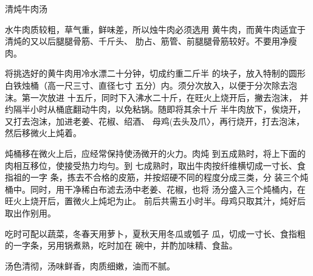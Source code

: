 \begin{recipe}{清炖牛肉汤}

\ingredients



\cooking

水牛肉质较粗，草气重，鲜味差，所以烛牛肉必须选用 黄牛肉，而黄牛肉适宜于清炖的又以后腿腿骨筋、千斤头、 肋占、筋管、前腿腿骨筋较好。不要用净瘦肉。

将挑选好的黄牛肉用冷水漂二十分钟，切成约重二斤半 的块子，放入特制的圆形白铁烛桶（高一尺三寸、直径七寸 五分）内。须分次放入，以便于分次除去泡沫。第一次放进 十五斤，同时下入沸水二十斤，在旺火上烧开后，撇去泡沫， 并约隔半小时从桶底翻动牛肉，以免粘锅。随即将其余十斤 半牛肉放下，俟烧开，又打去泡沫，加进老姜、花椒、绍酒、 母鸡(去头及爪〉，再行烧开，打去泡沫，然后移微火上炖着。

炖桶移在微火上后，应经常保持使汤微开的火力。肉炖 到五成熟时，将上下面的肉相互移位，使接受热力均勻。到 七成熟时，取出牛肉按纤维横切成一寸长、食指祖的一字 条，拣去不合格的皮筋，并按炤硬不同的程度分成三类，分 装三个炖桶中。同时，用干净稀白布滤去汤中老姜、花椒，也将 汤分盛入三个炖桶内，在旺火上烧开后，置微火上炖圯为止。 前后共需五小时半。母鸡只取其汁，炖好后取出作别用。

吃时可配以蔬菜，冬春天用萝卜，夏秋天用冬瓜或瓠子 瓜，切成一寸长、食指粗的一字条，另用锅煮熟，吃时加在 碗中，并酌加味精、食盐。

\notes

汤色清彻，汤味鲜香，肉质细嫩，油而不腻。

\end{recipe}

